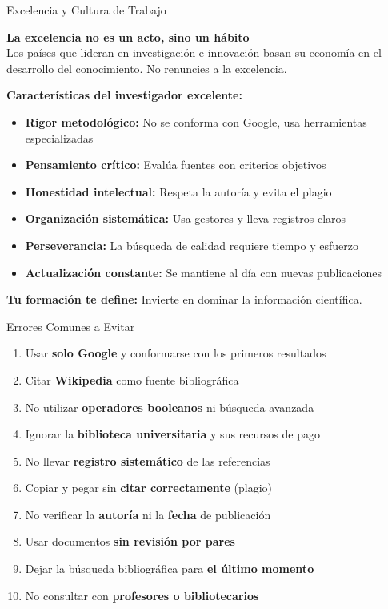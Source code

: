 \documentclass[11pt,aspectratio=169]{beamer}
\begin{document}
\begin{frame}{Excelencia y Cultura de Trabajo}

	\textbf{La excelencia no es un acto, sino un hábito}\\[0.3cm]
	Los países que lideran en investigación e innovación basan su economía en el desarrollo del conocimiento. No renuncies a la excelencia.


	\vspace{0.3cm}

	\textbf{Características del investigador excelente:}
	\begin{itemize}
		\item \textbf{Rigor metodológico:} No se conforma con Google, usa herramientas especializadas
		\item \textbf{Pensamiento crítico:} Evalúa fuentes con criterios objetivos
		\item \textbf{Honestidad intelectual:} Respeta la autoría y evita el plagio
		\item \textbf{Organización sistemática:} Usa gestores y lleva registros claros
		\item \textbf{Perseverancia:} La búsqueda de calidad requiere tiempo y esfuerzo
		\item \textbf{Actualización constante:} Se mantiene al día con nuevas publicaciones
	\end{itemize}

	\vspace{0.2cm}

	\textbf{Tu formación te define:} Invierte en dominar la información científica.

\end{frame}


\begin{frame}{Errores Comunes a Evitar}

	\small
	\begin{enumerate}
		\item Usar \textbf{solo Google} y conformarse con los primeros resultados
		\item Citar \textbf{Wikipedia} como fuente bibliográfica
		\item No utilizar \textbf{operadores booleanos} ni búsqueda avanzada
		\item Ignorar la \textbf{biblioteca universitaria} y sus recursos de pago
		\item No llevar \textbf{registro sistemático} de las referencias
		\item Copiar y pegar sin \textbf{citar correctamente} (plagio)
		\item No verificar la \textbf{autoría} ni la \textbf{fecha} de publicación
		\item Usar documentos \textbf{sin revisión por pares}
		\item Dejar la búsqueda bibliográfica para \textbf{el último momento}
		\item No consultar con \textbf{profesores o bibliotecarios}
	\end{enumerate}
\end{frame}
\end{document}
